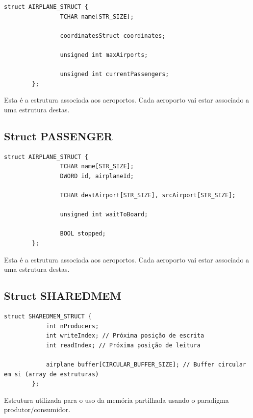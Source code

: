 \documentclass[11pt]{article}
\begin{document}
	\begin{lstlisting}[caption=Struct AIRPORT]
		struct AIRPLANE_STRUCT {
		        TCHAR name[STR_SIZE];

            	coordinatesStruct coordinates;
            
            	unsigned int maxAirports;
            
            	unsigned int currentPassengers;
		};
	\end{lstlisting}

	Esta é a estrutura associada aos aeroportos. Cada aeroporto vai estar associado a uma estrutura destas.
	
	
	
	\large
	\subsection{Struct PASSENGER}
	\normalsize

	\begin{lstlisting}[caption=Struct PASSENGER]
		struct AIRPLANE_STRUCT {
		        TCHAR name[STR_SIZE];
            	DWORD id, airplaneId;
            
            	TCHAR destAirport[STR_SIZE], srcAirport[STR_SIZE];
            
            	unsigned int waitToBoard;
            
            	BOOL stopped;
		};
	\end{lstlisting}

	Esta é a estrutura associada aos aeroportos. Cada aeroporto vai estar associado a uma estrutura destas.
	
	
	\large
	\subsection{Struct SHAREDMEM}
	\normalsize
	
	\begin{lstlisting}[caption=Struct SHAREDMEM\_STRUCT]
        struct SHAREDMEM_STRUCT {
        	int nProducers;
        	int writeIndex; // Próxima posição de escrita
        	int readIndex; // Próxima posição de leitura
        
        	airplane buffer[CIRCULAR_BUFFER_SIZE]; // Buffer circular em si (array de estruturas)
        };
	\end{lstlisting}
	
	Estrutura utilizada para o uso da memória partilhada usando o paradigma produtor/consumidor.
	
	
	\large
\end{document}
